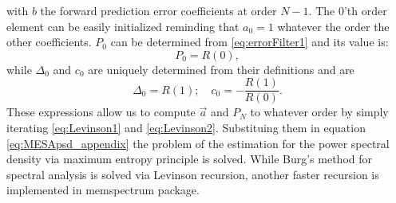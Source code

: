 \documentclass[twocolumn,showpacs,preprintnumbers,nofootinbib,prd,
superscriptaddress,10pt]{revtex4-1}
\begin{document}
with $b$ the forward prediction error coefficients at order $N-1$. 
The 0'th order element can be easily initialized reminding that $a_0 = 1$ whatever the order the other coefficients. $P_0$ can be determined from \ref{eq:errorFilter1} and its value is: 
\begin{equation}
P_0 = R(0),
\end{equation}
 while $\Delta_0$ and $c_0$ are uniquely determined from their definitions and are
\begin{equation}
\Delta_0 = R(1); \quad c_0 = -\frac{R(1)}{R(0)}. 
\end{equation}
These expressions allow us to compute $\vec a$ and $P_N$ to whatever order by simply iterating \ref{eq:Levinson1} and \ref{eq:Levinson2}. Substituing them in equation \ref{eq:MESApsd_appendix} the problem of the estimation for the power spectral density via maximum entropy principle is solved. While Burg's method for spectral analysis is solved via Levinson recursion, another faster recursion \cite{Vos} is implemented in memspectrum package.


	
	
\end{document}
